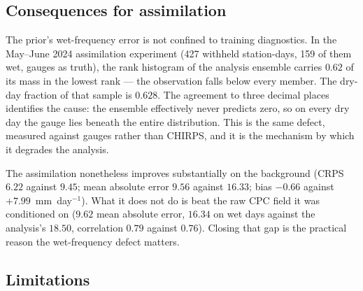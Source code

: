 \subsection{Consequences for assimilation}

The prior's wet-frequency error is not confined to training diagnostics. In the
May--June 2024 assimilation experiment (427 withheld station-days, 159 of them
wet, gauges as truth), the rank histogram of the analysis ensemble carries
$0.62$ of its mass in the lowest rank --- the observation falls below every
member. The dry-day fraction of that sample is $0.628$. The agreement to three
decimal places identifies the cause: the ensemble effectively never predicts
zero, so on every dry day the gauge lies beneath the entire distribution. This
is the same defect, measured against gauges rather than CHIRPS, and it is the
mechanism by which it degrades the analysis.

The assimilation nonetheless improves substantially on the background (CRPS
$6.22$ against $9.45$; mean absolute error $9.56$ against $16.33$; bias $-0.66$
against $+7.99$~mm~day$^{-1}$). What it does not do is beat the raw CPC field it
was conditioned on ($9.62$ mean absolute error, $16.34$ on wet days against the
analysis's $18.50$, correlation $0.79$ against $0.76$). Closing that gap is the
practical reason the wet-frequency defect matters.

\subsection{Limitations}

